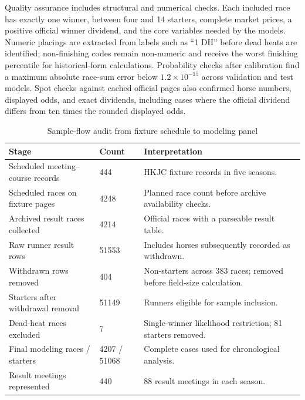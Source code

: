 Quality assurance includes structural and numerical checks. Each included race has exactly one winner, between four and 14 starters, complete market prices, a positive official winner dividend, and the core variables needed by the models. Numeric placings are extracted from labels such as ``1 DH'' before dead heats are identified; non-finishing codes remain non-numeric and receive the worst finishing percentile for historical-form calculations. Probability checks after calibration find a maximum absolute race-sum error below $1.2\times10^{-15}$ across validation and test models. Spot checks against cached official pages also confirmed horse numbers, displayed odds, and exact dividends, including cases where the official dividend differs from ten times the rounded displayed odds.

\begin{table}[htbp]
\centering
\caption{Sample-flow audit from fixture schedule to modeling panel}\label{tab:sampleflow}
\small
\begin{tabularx}{\textwidth}{L{7.3cm} R{2.2cm} Y}
\toprule
\textbf{Stage} & \textbf{Count} & \textbf{Interpretation} \\
\midrule
Scheduled meeting--course records & 444 & HKJC fixture records in five seasons. \\
Scheduled races on fixture pages & \num{4248} & Planned race count before archive availability checks. \\
Archived result races collected & \num{4214} & Official races with a parseable result table. \\
Raw runner result rows & \num{51553} & Includes horses subsequently recorded as withdrawn. \\
Withdrawn rows removed & 404 & Non-starters across 383 races; removed before field-size calculation. \\
Starters after withdrawal removal & \num{51149} & Runners eligible for sample inclusion. \\
Dead-heat races excluded & 7 & Single-winner likelihood restriction; 81 starters removed. \\
Final modeling races / starters & \num{4207} / \num{51068} & Complete cases used for chronological analysis. \\
Result meetings represented & 440 & 88 result meetings in each season. \\
\bottomrule
\end{tabularx}
\end{table}

